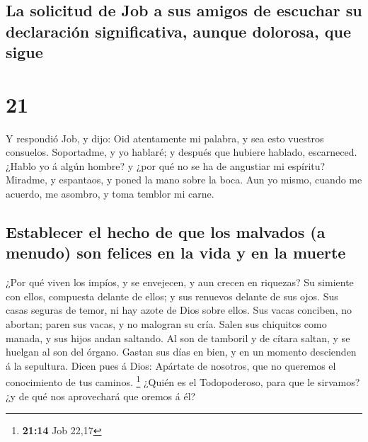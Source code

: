 \hypertarget{la-solicitud-de-job-a-sus-amigos-de-escuchar-su-declaraciuxf3n-significativa-aunque-dolorosa-que-sigue}{%
\subsection{La solicitud de Job a sus amigos de escuchar su declaración
significativa, aunque dolorosa, que
sigue}\label{la-solicitud-de-job-a-sus-amigos-de-escuchar-su-declaraciuxf3n-significativa-aunque-dolorosa-que-sigue}}

\hypertarget{section-20}{%
\section{21}\label{section-20}}

 Y respondió Job, y dijo:  Oid atentamente
mi palabra, y sea esto vuestros consuelos.  Soportadme, y
yo hablaré; y después que hubiere hablado, escarneced. 
¿Hablo yo á algún hombre? y ¿por qué no se ha de angustiar mi espíritu?
 Miradme, y espantaos, y poned la mano sobre la boca.
 Aun yo mismo, cuando me acuerdo, me asombro, y toma
temblor mi carne.

\hypertarget{establecer-el-hecho-de-que-los-malvados-a-menudo-son-felices-en-la-vida-y-en-la-muerte}{%
\subsection{Establecer el hecho de que los malvados (a menudo) son
felices en la vida y en la
muerte}\label{establecer-el-hecho-de-que-los-malvados-a-menudo-son-felices-en-la-vida-y-en-la-muerte}}

 ¿Por qué viven los impíos, y se envejecen, y aun crecen
en riquezas?  Su simiente con ellos, compuesta delante de
ellos; y sus renuevos delante de sus ojos.  Sus casas
seguras de temor, ni hay azote de Dios sobre ellos.  Sus
vacas conciben, no abortan; paren sus vacas, y no malogran su cría.
 Salen sus chiquitos como manada, y sus hijos andan
saltando.  Al son de tamboril y de cítara saltan, y se
huelgan al son del órgano.  Gastan sus días en bien, y en
un momento descienden á la sepultura.  Dicen pues á Dios:
Apártate de nosotros, que no queremos el conocimiento de tus caminos.
\footnote{\textbf{21:14} Job 22,17}  ¿Quién es el
Todopoderoso, para que le sirvamos? ¿y de qué nos aprovechará que oremos
á él?

